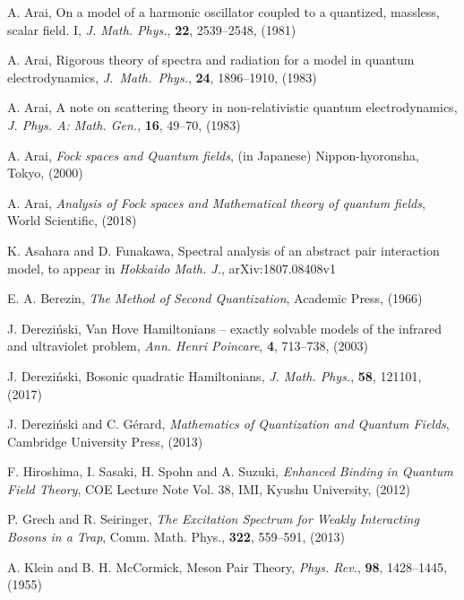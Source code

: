 \documentclass[12pt,draft]{article}
\theoremstyle{plain}
\numberwithin{equation}{section}
\theoremstyle{remark}
\begin{document}
{\small
\begin{thebibliography}{00}

 {A. Arai},
 {On a model of a harmonic oscillator coupled to a quantized, massless, scalar field. I},
 \textit{J. Math. Phys.}, \textbf{22}, 2539--2548, (1981)

 {A. Arai},
 {Rigorous theory of spectra and radiation for a model in quantum electrodynamics},
 \textit{J.~Math.~Phys.}, {\bf 24}, 1896--1910, (1983)
 
{A. Arai},
 {A note on scattering theory in non-relativistic quantum electrodynamics},
 \textit{J. Phys. A: Math. Gen.}, {\bf16}, 49--70, (1983)
 
 {A. Arai},
 \textit{Fock spaces and Quantum fields},
 (in Japanese) Nippon-hyoronsha, Tokyo, (2000)
 
  {A. Arai},
  \textit{Analysis of Fock spaces and Mathematical theory of quantum fields},
  {World Scientific}, (2018)

 {K. Asahara and D. Funakawa},
 {Spectral analysis of an abstract pair interaction model}, 
 to appear in \textit{Hokkaido Math. J.}, arXiv:1807.08408v1

  {E. A. Berezin},
  \textit{The Method of Second Quantization},
  {Academic Press}, (1966)

   {J. Derezi\'{n}ski},
   {Van Hove Hamiltonians -- exactly solvable models of the infrared and ultraviolet problem},
   \textit{Ann. Henri Poincare}, \textbf{4}, 713--738, (2003)

  {J. Derezi\'{n}ski},
  {Bosonic quadratic Hamiltonians},
  \textit{J. Math. Phys.}, \textbf{58}, 121101, (2017)

  {J. Derezi\'{n}ski and C. G\'{e}rard},
  \textit{Mathematics of Quantization and Quantum Fields},
  {Cambridge University Press}, (2013)

  {F. Hiroshima, I. Sasaki, H. Spohn and A. Suzuki}, 
  \textit{Enhanced Binding in Quantum Field Theory}, 
  {COE Lecture Note Vol. 38}, IMI, Kyushu University, (2012)

  {P. Grech and R. Seiringer},
  \textit{The Excitation Spectrum for Weakly Interacting Bosons in a Trap},
  {Comm. Math. Phys.}, \textbf{322}, 559--591, (2013)

  {A. Klein and B. H. McCormick},
  {Meson Pair Theory}, 
  \textit{Phys. Rev.}, \textbf{98}, 1428--1445, (1955)


\end{thebibliography}}
\end{document}
